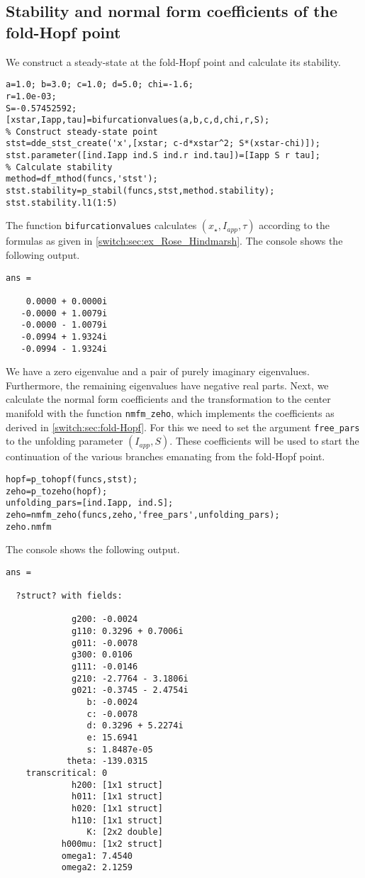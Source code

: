 \subsection{Stability and normal form coefficients of the fold-Hopf point} We construct a steady-state at the fold-Hopf point and calculate its stability.
\begin{lstlisting}[style=customMatlab]
%% Construct fold-Hopf point
a=1.0; b=3.0; c=1.0; d=5.0; chi=-1.6;
r=1.0e-03;
S=-0.57452592;
[xstar,Iapp,tau]=bifurcationvalues(a,b,c,d,chi,r,S);
% Construct steady-state point
stst=dde_stst_create('x',[xstar; c-d*xstar^2; S*(xstar-chi)]);
stst.parameter([ind.Iapp ind.S ind.r ind.tau])=[Iapp S r tau];
% Calculate stability
method=df_mthod(funcs,'stst');
stst.stability=p_stabil(funcs,stst,method.stability);
stst.stability.l1(1:5)
\end{lstlisting}
The function \lstinline|bifurcationvalues| calculates $(x_\star,I_{app},\tau)$ according to the formulas as given in \cref{switch:sec:ex_Rose_Hindmarsh}. The \MATLAB console shows the following output.
\begin{lstlisting}[style=matlabConsole]
ans =

    0.0000 + 0.0000i
   -0.0000 + 1.0079i
   -0.0000 - 1.0079i
   -0.0994 + 1.9324i
   -0.0994 - 1.9324i
\end{lstlisting}
We have a zero eigenvalue and a pair of purely imaginary eigenvalues. Furthermore, the remaining eigenvalues have negative real parts. Next, we calculate the normal form coefficients and the transformation to the center manifold with the function \lstinline|nmfm_zeho|, which implements the coefficients as derived in \cref{switch:sec:fold-Hopf}. For this we need to set the argument \lstinline|free_pars| to the unfolding parameter $(I_{app},S)$. These coefficients will be used to start the continuation of the various branches emanating from the fold-Hopf point.
\begin{lstlisting}[style=customMatlab]
% Calculate normal coefficients
hopf=p_tohopf(funcs,stst);
zeho=p_tozeho(hopf);
unfolding_pars=[ind.Iapp, ind.S];
zeho=nmfm_zeho(funcs,zeho,'free_pars',unfolding_pars);
zeho.nmfm
\end{lstlisting}
The \MATLAB console shows the following output.
\begin{lstlisting}[style=matlabConsole,keepspaces=true]
ans = 

  ?struct? with fields:

             g200: -0.0024
             g110: 0.3296 + 0.7006i
             g011: -0.0078
             g300: 0.0106
             g111: -0.0146
             g210: -2.7764 - 3.1806i
             g021: -0.3745 - 2.4754i
                b: -0.0024
                c: -0.0078
                d: 0.3296 + 5.2274i
                e: 15.6941
                s: 1.8487e-05
            theta: -139.0315
    transcritical: 0
             h200: [1x1 struct]
             h011: [1x1 struct]
             h020: [1x1 struct]
             h110: [1x1 struct]
                K: [2x2 double]
           h000mu: [1x2 struct]
           omega1: 7.4540
           omega2: 2.1259
\end{lstlisting}
